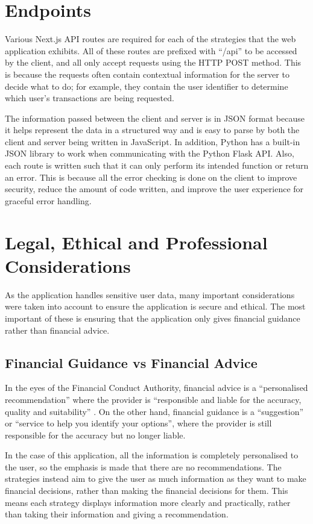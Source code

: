\section{Endpoints}
\label{sec:endpoints}
Various Next.js API routes are required for each of the strategies that the web application exhibits. All of these routes are prefixed with ``/api'' to be accessed by the client, and all only accept requests using the HTTP POST method. This is because the requests often contain contextual information for the server to decide what to do; for example, they contain the user identifier to determine which user's transactions are being requested.

The information passed between the client and server is in JSON format because it helps represent the data in a structured way and is easy to parse by both the client and server being written in JavaScript. In addition, Python has a built-in JSON library to work when communicating with the Python Flask API. Also, each route is written such that it can only perform its intended function or return an error. This is because all the error checking is done on the client to improve security, reduce the amount of code written, and improve the user experience for graceful error handling.

\section{Legal, Ethical and Professional Considerations}
As the application handles sensitive user data, many important considerations were taken into account to ensure the application is secure and ethical. The most important of these is ensuring that the application only gives financial guidance rather than financial advice.

\subsection{Financial Guidance vs Financial Advice}
In the eyes of the Financial Conduct Authority, financial advice is a ``personalised recommendation'' where the provider is ``responsible and liable for the accuracy, quality and suitability'' \cite{FCA}. On the other hand, financial guidance is a ``suggestion'' or ``service to help you identify your options'', where the provider is still responsible for the accuracy but no longer liable.

In the case of this application, all the information is completely personalised to the user, so the emphasis is made that there are no recommendations. The strategies instead aim to give the user as much information as they want to make financial decisions, rather than making the financial decisions for them. This means each strategy displays information more clearly and practically, rather than taking their information and giving a recommendation.

